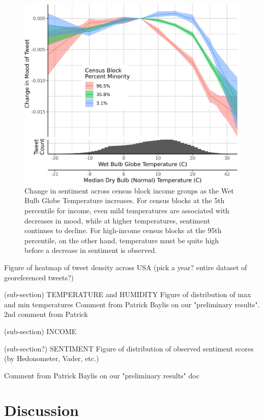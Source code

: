 \documentclass{article}
\begin{document}
\begin{figure}[H]
  \centering
  \includegraphics[width=\linewidth]{../res/wbgt-race.png}
  \caption{Change in sentiment across census block income groups as the Wet Bulb Globe Temperature increases.  For census blocks at the 5th percentile for income, even mild temperatures are associated with decreases in mood, while at higher temperatures, sentiment continues to decline.  For high-income census blocks at the 95th percentile, on the other hand, temperature must be quite high before a decrease in sentiment is observed.}
  \label{fig:wbgt-income}
\end{figure}



Figure of heatmap of tweet density across USA (pick a year? entire dataset of georeferenced tweets?)

(sub-section) TEMPERATURE and HUMIDITY
Figure of distribution of max and min temperatures
Comment from Patrick Baylis on our "preliminary results". 2nd comment from Patrick

(sub-section) INCOME

(sub-section?) SENTIMENT
Figure of distribution of observed sentiment scores (by Hedonometer, Vader, etc.)

Comment from Patrick Baylis on our "preliminary results" doc


\section{Discussion}
\end{document}
